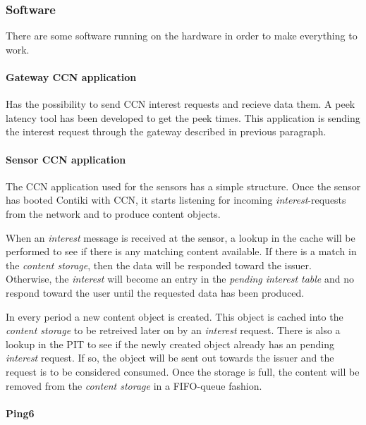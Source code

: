 \subsubsection{Software}
There are some software running on the hardware in order to make everything to work. 

\paragraph{Gateway CCN application}
Has the possibility to send CCN interest requests and recieve data them. A peek latency tool has been developed to get the peek times.
This application is sending the interest request through the gateway described in previous paragraph.

\paragraph{Sensor CCN application}
The CCN application used for the sensors has a simple structure. Once the sensor has booted Contiki with CCN, it starts listening for incoming \textit{interest}-requests from the network and to produce content objects.

When an \textit{interest} message is received at the sensor, a lookup in the cache will be performed to see if there is any matching content available. If there is a match in the \textit{content storage}, then the data will be responded toward the issuer. Otherwise, the \textit{interest} will become an entry in the \textit{pending interest table} and no respond toward the user until the requested data has been produced.

In every period a new content object is created. This object is cached into the \textit{content storage} to be retreived later on by an \textit{interest} request. There is also a lookup in the PIT to see if the newly created object already has an pending \textit{interest} request. If so, the object will be sent out towards the issuer and the request is to be considered consumed. Once the storage is full, the content will be removed from the \textit{content storage} in a FIFO-queue fashion.


\paragraph{Ping6}